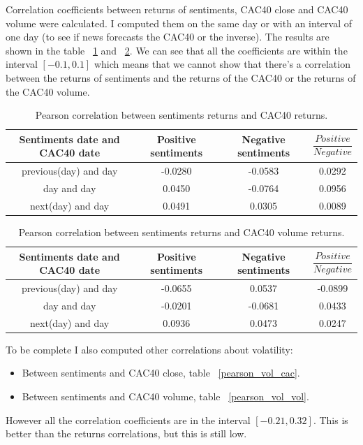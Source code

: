 \documentclass[12pt]{report}
\begin{document}
			Correlation coefficients between returns of sentiments, CAC40 close and CAC40 volume were calculated. I computed them on the same day or with an interval of one day (to see if news forecasts the CAC40 or the inverse). The results are shown in the table ~\ref{pearson_cac} and ~\ref{pearson_volume}. We can see that all the coefficients are within the interval $[-0.1, 0.1]$ which means that we cannot show that there's a correlation between the returns of sentiments and the returns of the CAC40 or the returns of the CAC40 volume.
			
			\begin{table}
			\begin{tabular}{|c || c | c | c|}
				\hline
				Sentiments date and CAC40 date & Positive sentiments & Negative sentiments & $\dfrac{Positive}{Negative}$\\
				\hline
				previous(day) and day & -0.0280 & -0.0583 & 0.0292\\
				\hline
				day and day & 0.0450 & -0.0764 & 0.0956\\
				\hline
				next(day) and day & 0.0491 & 0.0305 & 0.0089\\
				\hline
			\end{tabular}
			
			\caption{Pearson correlation between sentiments returns and CAC40 returns.\label{pearson_cac}}
			\end{table}

			\begin{table}
			\begin{tabular}{|c || c | c | c|}
				\hline
				Sentiments date and CAC40 date & Positive sentiments & Negative sentiments & $\dfrac{Positive}{Negative}$\\
				\hline
				previous(day) and day & -0.0655 & 0.0537 & -0.0899\\
				\hline
				day and day & -0.0201 & -0.0681 & 0.0433\\
				\hline
				next(day) and day & 0.0936 & 0.0473 & 0.0247\\
				\hline
			\end{tabular}
			
			\caption{Pearson correlation between sentiments returns and CAC40 volume returns.\label{pearson_volume}}
			\end{table}

		To be complete I also computed other correlations about volatility:
			\begin{itemize}
				\item Between sentiments and CAC40 close, table ~\ref{pearson_vol_cac}.
				\item Between sentiments and CAC40 volume, table ~\ref{pearson_vol_vol}.
			\end{itemize}
			However all the correlation coefficients are in the interval $[-0.21, 0.32]$. This is better than the returns correlations, but this is still low.
\end{document}
